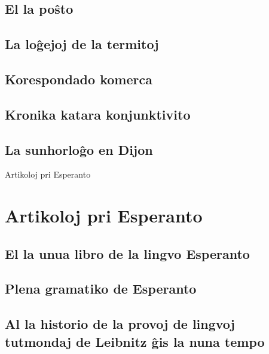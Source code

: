 \documentclass[a5paper,11pt,openany,twoside]{book}
\begin{document}
\section{El la po\^sto}
\label{posxto}


\section{La lo\^gejoj de la termitoj}
\label{termitoj}


\section{Korespondado komerca}
\label{komerca}


\section{Kronika katara konjunktivito}
\label{kronika}


\section{La sunhorlo\^go en Dijon}
\label{dijon}



 Artikoloj pri Esperanto

\chapter{Artikoloj pri Esperanto}
\section{El la unua libro de la lingvo Esperanto}
\label{unualibro}


\section{Plena gramatiko de Esperanto}
\label{plena}


\section[Al la historio de la provoj de lingvoj]{Al la historio de la provoj
de lingvoj tutmondaj de Leibnitz \^gis la  nuna tempo}
\label{leibnitz}

\end{document}
